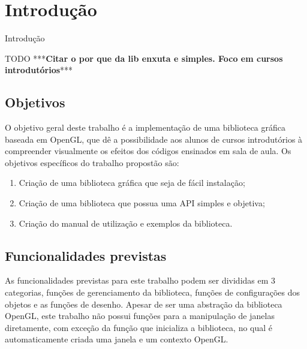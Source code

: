 \documentclass[12pt, %
openright,
oneside, %
a4paper,    %
brazil]{facom-ufu-abntex2}
\begin{document}

\tableofcontents*
\cleardoublepage





\textual



\chapter[Introdução]{Introdução}

Introdução

TODO ***\textbf{Citar o por que da lib enxuta e simples. Foco em cursos introdutórios}***

\section{Objetivos}
O objetivo geral deste trabalho é a implementação de uma biblioteca gráfica baseada em OpenGL, que dê a possibilidade aos alunos de cursos introdutórios à compreender visualmente os efeitos dos códigos ensinados em sala de aula. Os objetivos específicos do trabalho propostão são:

\begin{enumerate}
\item Criação de uma biblioteca gráfica que seja de fácil instalação;
\item Criação de uma biblioteca que possua uma API simples e objetiva;
\item Criação do manual de utilização e exemplos da biblioteca.
\end{enumerate}

\section{Funcionalidades previstas}
As funcionalidades previstas para este trabalho podem ser divididas em 3 categorias, funções de gerenciamento da biblioteca, funções de configurações dos objetos e as funções de desenho. Apesar de ser uma abstração da biblioteca OpenGL, este trabalho não possui funções para a manipulação de janelas diretamente, com exceção da função que inicializa a biblioteca, no qual é automaticamente criada uma janela e um contexto OpenGL.
\end{document}
